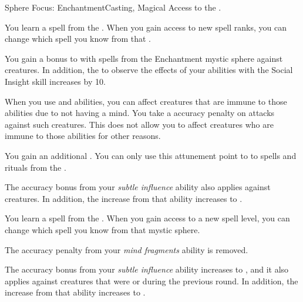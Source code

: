     \begin{feat}{Sphere Focus: Enchantment}{Casting, Magical}
        \featpre Access to the  .

         You learn a spell from the  .
        When you gain access to new spell ranks, you can change which spell you know from that .

         You gain a  bonus to  with spells from the Enchantment mystic sphere against \unaware creatures.
        In addition, the  to observe the effects of your  abilities with the Social Insight skill increases by 10.

         When you use  and  abilities, you can affect creatures that are immune to those abilities due to not having a mind.
        You take a  accuracy penalty on attacks against such creatures.
        This does not allow you to affect creatures who are immune to those abilities for other reasons.

         You gain an additional .
        You can only use this attunement point to  to spells and rituals from the  .

         The accuracy bonus from your \textit{subtle influence} ability also applies against \partiallyunaware creatures.
        In addition, the  increase from that ability increases to .

         You learn a spell from the  .
        When you gain access to a new spell level, you can change which spell you know from that mystic sphere.

         The accuracy penalty from your \textit{mind fragments} ability is removed.

         The accuracy bonus from your \textit{subtle influence} ability increases to , and it also applies against creatures that were \unaware or \partiallyunaware during the previous round.
        In addition, the  increase from that ability increases to .
    \end{feat}

